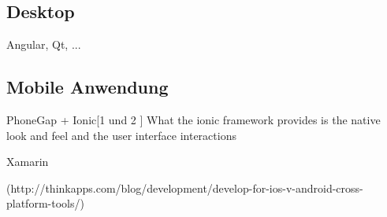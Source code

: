 

\subsection{Desktop}
Angular, Qt, ...
\subsection{Mobile Anwendung}
PhoneGap + Ionic[1 und 2 ] %
		 What the ionic framework provides is the native look and feel and the user interface interactions

Xamarin  

 (http://thinkapps.com/blog/development/develop-for-ios-v-android-cross-platform-tools/) 

